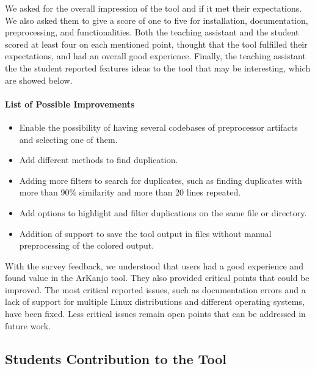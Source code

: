 We asked for the overall impression of the tool and if it met their expectations. We also asked 
them to give a score of one to five for installation, documentation, preprocessing, and functionalities. 
Both the teaching assistant and the student scored at least four on each mentioned point, thought that 
the tool fulfilled their expectations, and had an overall good experience. Finally, the teaching assistant 
the the student reported features ideas to the tool that may be interesting, which 
are showed below.

\paragraph{List of Possible Improvements}

\begin{itemize}

\item Enable the possibility of having several codebases of preprocessor artifacts and selecting one of them.

\item Add different methods to find duplication.

\item Adding more filters to search for duplicates, such as finding duplicates with more than 90\% 
similarity and more than 20 lines repeated.

\item Add options to highlight and filter duplications on the same file or directory.

\item Addition of support to save the tool output in files without manual preprocessing of the colored output.

\end{itemize}

With the survey feedback, we understood that users had a good experience and found value in the 
ArKanjo tool. They also provided critical points that could be improved. The most critical 
reported issues, such as documentation errors and a lack of support for multiple Linux distributions 
and different operating systems, have been fixed. Less critical issues remain open points that 
can be addressed in future work.

\subsection{Students Contribution to the Tool}

